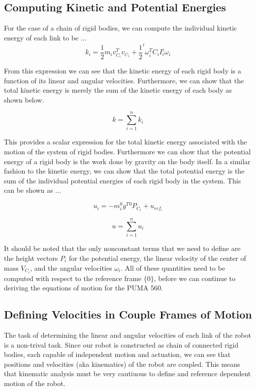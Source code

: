 \subsection*{Computing Kinetic and Potential Energies}

For the case of a chain of rigid bodies, we can compute the individual kinetic energy of each link to be ...
$$
k_{i}=\frac{1}{2} m_{i} v_{C_{i}}^{T} v_{C_{i}}+\frac{1}{2}^{i} \omega_{i}^{T} C_{i} I_{i}^{i} \omega_{i}
$$

\noindent From this expression we can see that the kinetic energy of each rigid body is a function of its linear and angular velocities. Furthermore, we can show that the total kinetic energy is merely the sum of the kinetic energy of each body as shown below.

$$
k=\sum_{i=1}^{n} k_{i}
$$

\noindent This provides a scalar expression for the total kinetic energy associated with the motion of the system of rigid bodies. Furthermore we can show that the potential energy of a rigid body is the work done by gravity on the body itself. In a similar fashion to the kinetic energy, we can show that the total potential energy is the sum of the individual potential energies of each rigid body in the system. This can be shown as ...

$$
u_{i}=-m_{i}^{0} g^{T}{ }^{0} P_{C_{i}}+u_{r e f_{i}}
$$

$$
u=\sum_{i=1}^{n} u_{i}
$$


\noindent It should be noted that the only nonconstant terms that we need to define are the height vectors $P_i$ for the potential energy, the linear velocity of the center of mass $V_{C_{i}}$, and the angular velocities $\omega_i$. All of these quantities need to be computed with respect to the reference frame $\{ 0 \}$, before we can continue to deriving the equations of motion for the PUMA 560.

\subsection*{Defining Velocities in Couple Frames of Motion}

The task of determining the linear and angular velocities of each link of the robot is a non-trival task. Since our robot is constructed as chain of connected rigid bodies, each capable of independent motion and actuation, we can see that positions and velocities (aka kinematics) of the robot are coupled. This means that kinematic analysis must be very cautiuous to define and reference dependent motion of the robot.\\

